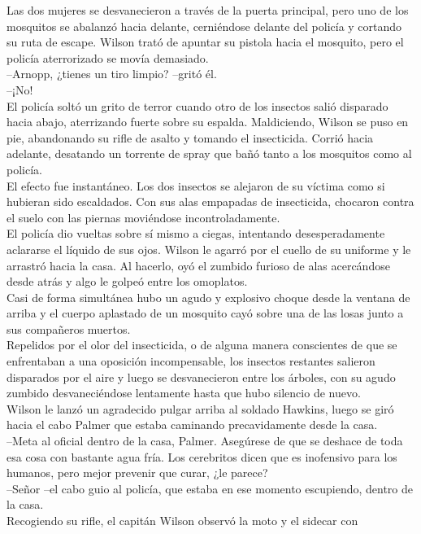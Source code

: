 Las dos mujeres se desvanecieron a través de la puerta principal, pero
uno de los mosquitos se abalanzó hacia delante, cerniéndose delante del
policía y cortando su ruta de escape. Wilson trató de apuntar su pistola
hacia el mosquito, pero el policía aterrorizado se movía demasiado.\\
--Arnopp, ¿tienes un tiro limpio? --gritó él.\\
--¡No!\\
El policía soltó un grito de terror cuando otro de los insectos salió
disparado hacia abajo, aterrizando fuerte sobre su espalda. Maldiciendo,
Wilson se puso en pie, abandonando su rifle de asalto y tomando el
insecticida. Corrió hacia adelante, desatando un torrente de spray que
bañó tanto a los mosquitos como al policía.\\
El efecto fue instantáneo. Los dos insectos se alejaron de su víctima
como si hubieran sido escaldados. Con sus alas empapadas de insecticida,
chocaron contra el suelo con las piernas moviéndose incontroladamente.\\
El policía dio vueltas sobre sí mismo a ciegas, intentando
desesperadamente aclararse el líquido de sus ojos. Wilson le agarró por
el cuello de su uniforme y le arrastró hacia la casa. Al hacerlo, oyó el
zumbido furioso de alas acercándose desde atrás y algo le golpeó entre
los omoplatos.\\
Casi de forma simultánea hubo un agudo y explosivo choque desde la
ventana de arriba y el cuerpo aplastado de un mosquito cayó sobre una de
las losas junto a sus compañeros muertos.\\
Repelidos por el olor del insecticida, o de alguna manera conscientes de
que se enfrentaban a una oposición incompensable, los insectos restantes
salieron disparados por el aire y luego se desvanecieron entre los
árboles, con su agudo zumbido desvaneciéndose lentamente hasta que hubo
silencio de nuevo.\\
Wilson le lanzó un agradecido pulgar arriba al soldado Hawkins, luego se
giró hacia el cabo Palmer que estaba caminando precavidamente desde la
casa.\\
--Meta al oficial dentro de la casa, Palmer. Asegúrese de que se deshace
de toda esa cosa con bastante agua fría. Los cerebritos dicen que es
inofensivo para los humanos, pero mejor prevenir que curar, ¿le
parece?\\
--Señor --el cabo guio al policía, que estaba en ese momento escupiendo,
dentro de la casa.\\
Recogiendo su rifle, el capitán Wilson observó la moto y el sidecar con
